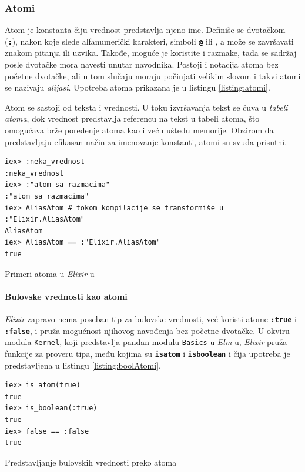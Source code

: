 \documentclass[12pt,oneside]{memoir}
\begin{document}
\subsubsection{Atomi}
Atom je konstanta čiju vrednost predstavlja njeno ime. Definiše se dvotačkom (\texttt{\textbf{:}}),
nakon koje slede alfanumerički karakteri, simboli \texttt{\textbf{@}} ili 
\texttt{\textbf{\textunderscore}}, a može se završavati znakom pitanja ili uzvika. Takođe, moguće
je koristite i razmake, tada se sadržaj posle dvotačke mora navesti unutar navodnika.
Postoji i notacija atoma bez početne dvotačke, ali u tom slučaju moraju počinjati velikim
slovom i takvi atomi se nazivaju \emph{alijasi}. Upotreba atoma prikazana je u listingu
\ref{listing:atomi}.

Atom se sastoji od teksta i vrednosti. U toku izvršavanja tekst se čuva u \emph{tabeli atoma},
dok vrednost predstavlja referencu na tekst u tabeli atoma, što omogućava brže poređenje atoma
kao i veću uštedu memorije. Obzirom da predstavljaju efikasan način za imenovanje konstanti,
atomi su svuda prisutni.
\begin{listing}[!h]
\begin{verbatim}
iex> :neka_vrednost
:neka_vrednost
iex> :"atom sa razmacima"
:"atom sa razmacima"
iex> AliasAtom # tokom kompilacije se transformiše u :"Elixir.AliasAtom"
AliasAtom
iex> AliasAtom == :"Elixir.AliasAtom"
true
\end{verbatim}
\caption{Primeri atoma u \emph{Elixir}-u}
\label{listing:atomi}
\end{listing}
\paragraph{Bulovske vrednosti kao atomi}
\emph{Elixir} zapravo nema poseban tip za bulovske vrednosti, već koristi atome \texttt{\textbf{:true}}
i \texttt{\textbf{:false}}, i pruža mogućnost njihovog navođenja bez početne dvotačke. U okviru
modula \texttt{Kernel}, koji predstavlja pandan modulu \texttt{Basics} u \emph{Elm}-u, \emph{Elixir} pruža
funkcije za proveru tipa, među kojima su \texttt{\textbf{is{\textunderscore}atom}} i
\texttt{\textbf{is{\textunderscore}boolean}} i čija upotreba je predstavljena u listingu
\ref{listing:boolAtomi}.
\begin{listing}[!h]
\begin{verbatim}
iex> is_atom(true)
true
iex> is_boolean(:true)
true
iex> false == :false
true
\end{verbatim}
\caption{Predstavljanje bulovskih vrednosti preko atoma}
\label{listing:boolAtomi}
\end{listing}
\end{document}
